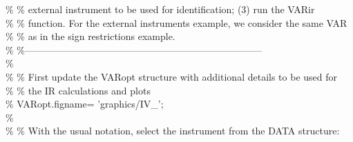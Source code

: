 \hspace{1mm}\textcolor{matlabgreen}{\% }\textcolor{matlabgreen}{\% external instrument to be used \textcolor{matlabblue}{for} identification; (3) run the VARir  }\\ 
\hspace{1mm}\hspace{5mm} \textcolor{matlabgreen}{\% }\textcolor{matlabgreen}{\% function. For the external instruments example, we consider the same VAR  }\\ 
\hspace{1mm}\hspace{5mm} \textcolor{matlabgreen}{\% }\textcolor{matlabgreen}{\% as in the sign restrictions example.  }\\ 
\hspace{1mm}\hspace{5mm} \textcolor{matlabgreen}{\% }\textcolor{matlabgreen}{\%--------------------------------------------------------------------------  }\\ 
\hspace{1mm}\hspace{5mm} \textcolor{matlabgreen}{\%  }\\ 
\hspace{1mm}\hspace{5mm} \textcolor{matlabgreen}{\% }\textcolor{matlabgreen}{\% First update the VARopt structure with additional details to be used \textcolor{matlabblue}{for} }\\ 
\hspace{1mm}\hspace{5mm} \hspace{5mm} \textcolor{matlabgreen}{\% }\textcolor{matlabgreen}{\% the IR calculations and plots }\\ 
\hspace{1mm}\hspace{5mm} \hspace{5mm} \textcolor{matlabgreen}{\% VARopt.figname= 'graphics/IV\_'; }\\ 
\hspace{1mm}\hspace{5mm} \hspace{5mm} \textcolor{matlabgreen}{\%  }\\ 
\hspace{1mm}\hspace{5mm} \hspace{5mm} \textcolor{matlabgreen}{\% }\textcolor{matlabgreen}{\% With the usual notation, select the instrument from the DATA structure: }\\ 
